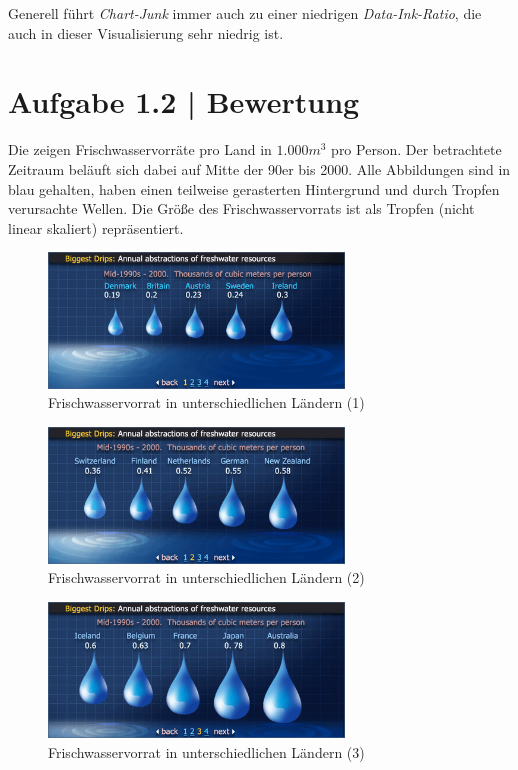 \documentclass[a4paper,12pt,ngerman]{scrartcl}
\begin{document}
Generell führt \emph{Chart-Junk} immer auch zu einer niedrigen \emph{Data-Ink-Ratio}, die auch in dieser Visualisierung sehr niedrig ist.

\section{Aufgabe 1.2 | Bewertung}

Die  zeigen Frischwasservorräte pro Land in $1.000 m^3$ pro Person. Der betrachtete Zeitraum beläuft sich dabei auf Mitte der 90er bis 2000. Alle Abbildungen sind in blau gehalten, haben einen teilweise gerasterten Hintergrund und durch Tropfen verursachte Wellen. Die Größe des Frischwasservorrats ist als Tropfen (nicht linear skaliert) repräsentiert.

\begin{figure}
    \centering
    \includegraphics[width=0.7\textwidth]{includes/water-0}
    \caption{Frischwasservorrat in unterschiedlichen Ländern (1)}
    \label{water-0}
\end{figure}

\begin{figure}
    \centering
    \includegraphics[width=0.7\textwidth]{includes/water-1}
    \caption{Frischwasservorrat in unterschiedlichen Ländern (2)}
    \label{water-1}
\end{figure}

\begin{figure}
    \centering
    \includegraphics[width=0.7\textwidth]{includes/water-2}
    \caption{Frischwasservorrat in unterschiedlichen Ländern (3)}
    \label{water-2}
\end{figure}
\end{document}
